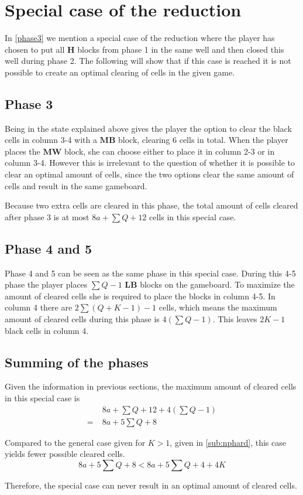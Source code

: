 \section{Special case of the reduction}
\label{specialcasereduction}

In \ref{phase3} we mention a special case of the reduction where the player has chosen to put all $\mathbf{H}$ blocks from phase 1 in the same well and then closed this well during phase 2. The following will show that if this case is reached it is not possible to create an optimal clearing of cells in the given game.

\subsection*{Phase 3}
Being in the state explained above gives the player the option to clear the black cells in column 3-4 with a $\mathbf{MB}$ block, clearing 6 cells in total. When the player places the $\mathbf{MW}$ block, she can choose either to place it in column 2-3 or in column 3-4. However this is irrelevant to the question of whether it is possible to clear an optimal amount of cells, since the two options clear the same amount of cells and result in the same gameboard.

Because two extra cells are cleared in this phase, the total amount of cells cleared after phase 3 is at most $8a + \sum Q + 12$ cells in this special case.

\subsection*{Phase 4 and 5}

Phase 4 and 5 can be seen as the same phase in this special case. During this 4-5 phase the player places $\sum Q - 1$ $\mathbf{LB}$ blocks on the gameboard. To maximize the amount of cleared cells she is required to place the blocks in column 4-5. In column 4 there are $2 \sum \left( Q + K - 1 \right) - 1$ cells, which means the maximum amount of cleared cells during this phase is $ 4 \left( \sum Q - 1 \right)$. This leaves $2K-1$ black cells in column 4.

\subsection*{Summing of the phases}

Given the information in previous sections, the maximum amount of cleared cells in this special case is
\begin{align*}
  & 8a + \sum Q + 12 + 4 \left( \sum Q - 1 \right) \\
= \; & 8a + 5 \sum Q + 8
\end{align*}

Compared to the general case given for $K > 1$, given in \ref{sub:nphard}, this case yields fewer possible cleared cells.
\begin{equation*}
8a + 5 \sum Q + 8 < 8a + 5 \sum Q + 4 + 4K
\end{equation*}

Therefore, the special case can never result in an optimal amount of cleared cells.
